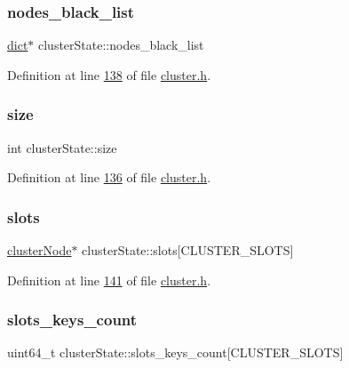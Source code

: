 \subsubsection{\texorpdfstring{nodes\+\_\+black\+\_\+list}{nodes\_black\_list}}
{\footnotesize\ttfamily \hyperlink{structdict}{dict}$\ast$ cluster\+State\+::nodes\+\_\+black\+\_\+list}



Definition at line \hyperlink{cluster_8h_source_l00138}{138} of file \hyperlink{cluster_8h_source}{cluster.\+h}.

\mbox{\label{structclusterState_ac412fd88c5d16098266b34a8ca983906}} 
\subsubsection{\texorpdfstring{size}{size}}
{\footnotesize\ttfamily int cluster\+State\+::size}



Definition at line \hyperlink{cluster_8h_source_l00136}{136} of file \hyperlink{cluster_8h_source}{cluster.\+h}.

\mbox{\label{structclusterState_a3cb4d898f159addb27ef10d737d77842}} 
\subsubsection{\texorpdfstring{slots}{slots}}
{\footnotesize\ttfamily \hyperlink{structclusterNode}{cluster\+Node}$\ast$ cluster\+State\+::slots\mbox{[}C\+L\+U\+S\+T\+E\+R\+\_\+\+S\+L\+O\+TS\mbox{]}}



Definition at line \hyperlink{cluster_8h_source_l00141}{141} of file \hyperlink{cluster_8h_source}{cluster.\+h}.

\mbox{\label{structclusterState_ae85ad11c2ebc8a680883bf2e14a930d8}} 
\subsubsection{\texorpdfstring{slots\+\_\+keys\+\_\+count}{slots\_keys\_count}}
{\footnotesize\ttfamily uint64\+\_\+t cluster\+State\+::slots\+\_\+keys\+\_\+count\mbox{[}C\+L\+U\+S\+T\+E\+R\+\_\+\+S\+L\+O\+TS\mbox{]}}



